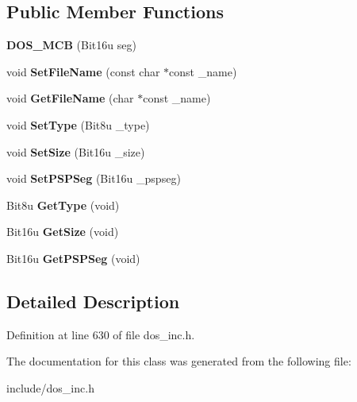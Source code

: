 \subsection*{Public Member Functions}
\begin{DoxyCompactItemize}
\item 
\hypertarget{classDOS__MCB_a0b1bf404720604aafd755212f8d06ffc}{{\bfseries D\-O\-S\-\_\-\-M\-C\-B} (Bit16u seg)}\label{classDOS__MCB_a0b1bf404720604aafd755212f8d06ffc}

\item 
\hypertarget{classDOS__MCB_adb5a8fae4d7777501c48f6fc783da385}{void {\bfseries Set\-File\-Name} (const char $\ast$const \-\_\-name)}\label{classDOS__MCB_adb5a8fae4d7777501c48f6fc783da385}

\item 
\hypertarget{classDOS__MCB_a9b76d148117232e7c4dceb0a7a990d3d}{void {\bfseries Get\-File\-Name} (char $\ast$const \-\_\-name)}\label{classDOS__MCB_a9b76d148117232e7c4dceb0a7a990d3d}

\item 
\hypertarget{classDOS__MCB_ab9545960540afa53f5ead1d49a48890e}{void {\bfseries Set\-Type} (Bit8u \-\_\-type)}\label{classDOS__MCB_ab9545960540afa53f5ead1d49a48890e}

\item 
\hypertarget{classDOS__MCB_a524e972434b1f0b57435a95d6dddd4b5}{void {\bfseries Set\-Size} (Bit16u \-\_\-size)}\label{classDOS__MCB_a524e972434b1f0b57435a95d6dddd4b5}

\item 
\hypertarget{classDOS__MCB_a4a0d73cdef5da789a59a2e141d69b0b6}{void {\bfseries Set\-P\-S\-P\-Seg} (Bit16u \-\_\-pspseg)}\label{classDOS__MCB_a4a0d73cdef5da789a59a2e141d69b0b6}

\item 
\hypertarget{classDOS__MCB_ab5aca8f3fe000215dd7a563a17a990f9}{Bit8u {\bfseries Get\-Type} (void)}\label{classDOS__MCB_ab5aca8f3fe000215dd7a563a17a990f9}

\item 
\hypertarget{classDOS__MCB_a133271b66d178a643a8090c2b3a8784d}{Bit16u {\bfseries Get\-Size} (void)}\label{classDOS__MCB_a133271b66d178a643a8090c2b3a8784d}

\item 
\hypertarget{classDOS__MCB_a3e8986ea9546d0d914202a41bd774288}{Bit16u {\bfseries Get\-P\-S\-P\-Seg} (void)}\label{classDOS__MCB_a3e8986ea9546d0d914202a41bd774288}

\end{DoxyCompactItemize}


\subsection{Detailed Description}


Definition at line 630 of file dos\-\_\-inc.\-h.



The documentation for this class was generated from the following file\-:\begin{DoxyCompactItemize}
\item 
include/dos\-\_\-inc.\-h\end{DoxyCompactItemize}
